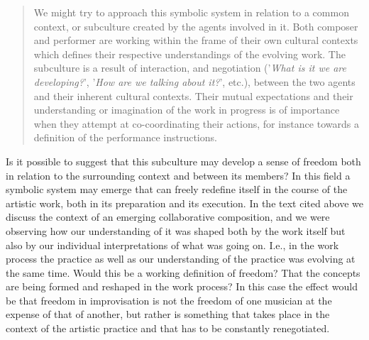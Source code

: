 \documentclass[a4paper]{article}
\begin{document}
\begin{quotation}
We might try to approach this symbolic system in relation to a common context, or subculture created by the agents involved in it. Both composer and performer are working within the frame of their own cultural contexts which defines their respective understandings of the evolving work. The subculture is a result of interaction, and negotiation ('\emph{What is it we are developing?}', '\emph{How are we talking about it?}', etc.), between the two agents and their inherent cultural contexts. Their mutual expectations and their understanding or imagination of the work in progress is of importance when they attempt at co-coordinating their actions, for instance towards a definition of the performance instructions. 
\end{quotation}

Is it possible to suggest that this subculture may develop a sense of freedom both in relation to the surrounding context and between its members? In this field a symbolic system may emerge that can freely redefine itself in the course of the artistic work, both in its preparation and its execution. In the text cited above we discuss the context of an emerging collaborative composition, and we were observing how our understanding of it was shaped both by the work itself but also by our individual interpretations of what was going on. I.e., in the work process the practice as well as our understanding of the practice was evolving at the same time. Would this be a working definition of freedom? That the concepts are being formed and reshaped in the work process? In this case the effect would be that freedom in improvisation is not the freedom of one musician at the expense of that of another, but rather is something that takes place in the context of the artistic practice and that has to be constantly renegotiated.
\end{document}
